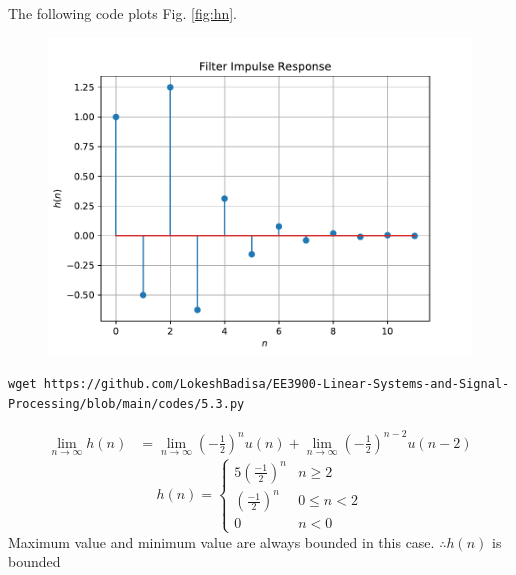 \documentclass[journal,12pt,twocolumn]{IEEEtran}
\providecommand{\brak}[1]{\ensuremath{\left(#1\right)}}
\numberwithin{equation}{section}
\renewcommand\thesection{\arabic{section}}
\begin{document}
\begin{enumerate}[label=\thesection.\arabic*]
The following code plots Fig. \ref{fig:hn}.
\begin{figure}[!ht]
\begin{center}
\includegraphics[width=\columnwidth]{./figs/hn}
\end{center}
\label{fig:xnyn}	
\end{figure}
\begin{lstlisting}
wget https://github.com/LokeshBadisa/EE3900-Linear-Systems-and-Signal-Processing/blob/main/codes/5.3.py
\end{lstlisting}

\begin{align}
\lim_{n\to\infty}h(n)&=\lim_{n\to\infty}\brak{-\frac{1}{2}}^{n}u(n) + \lim_{n\to\infty}\brak{-\frac{1}{2}}^{n-2}u(n-2)
\end{align}
\begin{equation}
h(n)
=
\begin{cases}
5\brak{\frac{-1}{2}}^n & n \ge 2
\\
\brak{\frac{-1}{2}}^n & 0\le n < 2
\\
0 & n<0
\end{cases}
\end{equation}
Maximum value and minimum value are always bounded in this case.
$\therefore h(n)$ is bounded


\end{enumerate}
\end{document}
